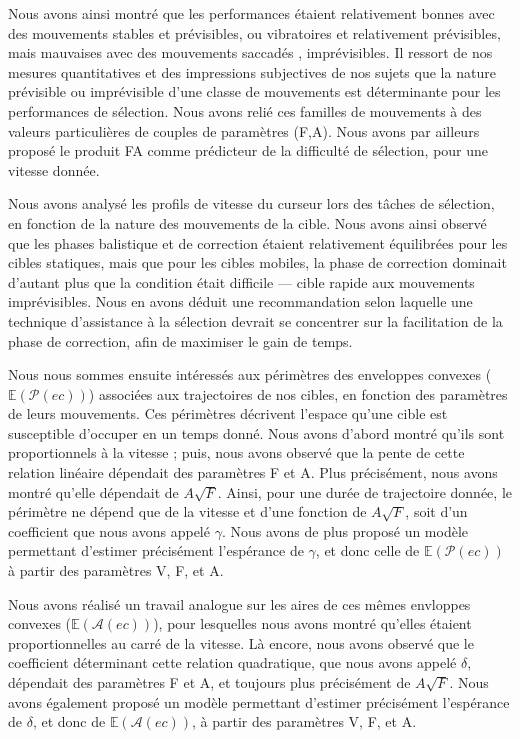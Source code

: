 	Nous avons ainsi montré que les performances étaient relativement bonnes avec des mouvements \og stables \fg{} et prévisibles, ou \og vibratoires \fg{} et relativement prévisibles, mais mauvaises avec des mouvements \og saccadés \fg{}, imprévisibles. Il ressort de nos mesures quantitatives et des impressions subjectives de nos sujets que la nature prévisible ou imprévisible d'une classe de mouvements est déterminante pour les performances de sélection. Nous avons relié ces familles de mouvements à des valeurs particulières de couples de paramètres (F,A). Nous avons par ailleurs proposé le produit FA comme prédicteur de la difficulté de sélection, pour une vitesse donnée.
	
	Nous avons analysé les profils de vitesse du curseur lors des tâches de sélection, en fonction de la nature des mouvements de la cible. Nous avons ainsi observé que les phases balistique et de correction étaient relativement équilibrées pour les cibles statiques, mais que pour les cibles mobiles, la phase de correction dominait d'autant plus que la condition était difficile --- cible rapide aux mouvements imprévisibles. Nous en avons déduit une recommandation selon laquelle une technique d'assistance à la sélection devrait se concentrer sur la facilitation de la phase de correction, afin de maximiser le gain de temps.
	
	Nous nous sommes ensuite intéressés aux périmètres des enveloppes convexes ($\mathbb{E}(\mathcal{P}(ec))$) associées aux trajectoires de nos cibles, en fonction des paramètres de leurs mouvements. Ces périmètres décrivent l'espace qu'une cible est susceptible d'occuper en un temps donné. Nous avons d'abord montré qu'ils sont proportionnels à la vitesse ; puis, nous avons observé que la pente de cette relation linéaire dépendait des paramètres F et A. Plus précisément, nous avons montré qu'elle dépendait de $A\sqrt{F}$. Ainsi, pour une durée de trajectoire donnée, le périmètre ne dépend que de la vitesse et d'une fonction de $A\sqrt{F}$, soit d'un coefficient que nous avons appelé $\gamma$. Nous avons de plus proposé un modèle permettant d'estimer précisément l'espérance de $\gamma$, et donc celle de $\mathbb{E}(\mathcal{P}(ec))$ à partir des paramètres V, F, et A.
	
	Nous avons réalisé un travail analogue sur les aires de ces mêmes envloppes convexes ($\mathbb{E}(\mathcal{A}(ec))$), pour lesquelles nous avons montré qu'elles étaient proportionnelles au carré de la vitesse. Là encore, nous avons observé que le coefficient déterminant cette relation quadratique, que nous avons appelé $\delta$, dépendait des paramètres F et A, et toujours plus précisément de $A\sqrt{F}$. Nous avons également proposé un modèle permettant d'estimer précisément l'espérance de $\delta$, et donc de $\mathbb{E}(\mathcal{A}(ec))$, à partir des paramètres V, F, et A.
	

